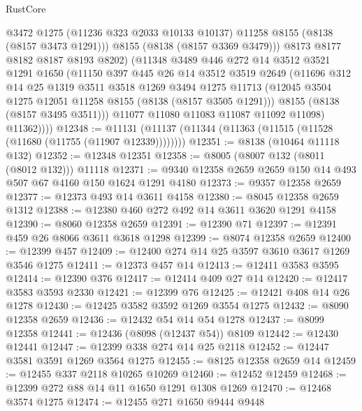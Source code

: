 \begin{lexlean}{RustCore}
\begin{coremodule}
                @3472
                @1275
                (@11236 @323 @2033 @10133 @10137)
                @11258
                @8155
                (@8138 (@8157 @3473 @1291)))
              @8155
              (@8138 (@8157 @3369 @3479)))
            @8173
            @8177
            @8182
            @8187
            @8193
            @8202)
          (@11348
            @3489
            @446
            @272
            @14
            @3512
            @3521
            @1291
            @1650
            (@11150
              @397
              @445
              @26
              @14
              @3512
              @3519
              @2649
              (@11696
                @312
                @14
                @25
                @1319
                @3511
                @3518
                @1269
                @3494
                @1275
                @11713
                (@12045 @3504 @1275 @12051 @11258 @8155 (@8138 (@8157 @3505 @1291)))
                @8155
                (@8138 (@8157 @3495 @3511)))
              @11077
              @11080
              @11083
              @11087
              @11092
              @11098)
            @11362))))
@12348 := @11131 (@11137 (@11344 (@11363 (@11515 (@11528 (@11680 (@11755 (@11907 @12339))))))))
@12351 := @8138 (@10464 @11118 @132)
@12352 := @12348 @12351
@12358 := @8005 (@8007 @132 (@8011 (@8012 @132))) @11118
@12371 := @9340 @12358 @2659 @2659 @150 @14 @493 @507 @67 @4160 @150 @1624 @1291 @4180
@12373 := @9357 @12358 @2659
@12377 := @12373 @493 @14 @3611 @4158
@12380 := @8045 @12358 @2659 @1312
@12388 := @12380 @460 @272 @492 @14 @3611 @3620 @1291 @4158
@12390 := @8060 @12358 @2659
@12391 := @12390 @71
@12397 := @12391 @459 @26 @8066 @3611 @3618 @1298
@12399 := @8074 @12358 @2659
@12400 := @12399 @457
@12409 := @12400 @274 @14 @25 @3597 @3610 @3617 @1269 @3546 @1275
@12411 := @12373 @457 @14
@12413 := @12411 @3583 @3595
@12414 := @12390 @376
@12417 := @12414 @409 @27 @14
@12420 := @12417 @3583 @3593 @2330
@12421 := @12399 @76
@12425 := @12421 @408 @14 @26 @1278
@12430 := @12425 @3582 @3592 @1269 @3554 @1275
@12432 := @8090 @12358 @2659
@12436 := @12432 @54 @14 @54 @1278
@12437 := @8099 @12358
@12441 := @12436 (@8098 (@12437 @54)) @8109
@12442 := @12430 @12441
@12447 := @12399 @338 @274 @14 @25 @2118
@12452 := @12447 @3581 @3591 @1269 @3564 @1275
@12455 := @8125 @12358 @2659 @14
@12459 := @12455 @337 @2118 @10265 @10269
@12460 := @12452 @12459
@12468 := @12399 @272 @88 @14 @11 @1650 @1291 @1308 @1269
@12470 := @12468 @3574 @1275
@12474 := @12455 @271 @1650 @9444 @9448

\end{coremodule}
\end{lexlean}
